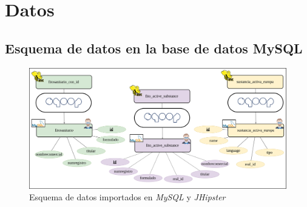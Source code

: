 \chapter{Datos} \label{a.datos}

\section{Esquema de datos en la base de datos MySQL} \label{a.datos.modelo}



\begin{landscape}

\begin{figure}[p!]
    
    \includegraphics[width=\linewidth]{Imagenes/datosmysql}
    \caption{Esquema de datos importados en \textit{MySQL} y \textit{JHipster}}
    \label{fig:datosmysql}
\end{figure}

\end{landscape}
